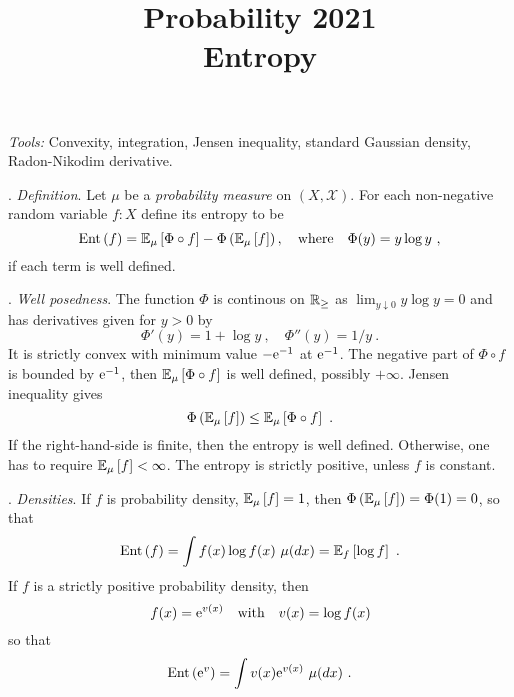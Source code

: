 \documentclass[12pt,a4paper]{amsart}
\title{Probability 2021 \\ Entropy}
\renewcommand{\entropyof}[1]{\operatorname{Ent}\left(#1\right)}
\begin{document}
\maketitle
\noindent\emph{Tools:} Convexity, integration, Jensen inequality, standard Gaussian density, Radon-Nikodim derivative.

\bigskip

. \emph{Definition}. Let $\mu$ be a \emph{probability measure} on
$(X,\mathcal X)$. For each non-negative random variable $f \colon X$
define its entropy to be
\begin{equation*}
  \entropyof{f} = \expectat \mu {\Phi\circ f} - \Phi\left(\expectat
    \mu f\right), \quad \text{where} \quad \Phi(y) = y \log y \ ,
\end{equation*}
if each term is well defined.

. \emph{Well posedness}. The function $\Phi$ is continous
on $\mathbb{R}_\geq$ as $\lim_{y \downarrow 0} y \log y = 0$ and has
derivatives given for $y > 0$ by
\begin{equation*}
  \Phi'(y) = 1 + \log y \ , \quad \Phi''(y)= 1/y \ .  
\end{equation*}
It is strictly convex with minimum value $-\mathrm{e}^{-1}$ at
$\mathrm{e}^{-1}$. The negative part of $\Phi\circ f$ is bounded by
$\mathrm{e}^{-1}$, then $\operatorname{\mathbb E}_{\mu}\left[\Phi\circ f\right]$ is well defined,
possibly $+\infty$. Jensen inequality gives
\begin{equation*}
  \Phi\left(\operatorname{\mathbb E}_{\mu}\left[f\right]\right) \leq \operatorname{\mathbb E}_{\mu}\left[\Phi\circ f\right] \ .
\end{equation*}
If the right-hand-side is finite, then the entropy is well
defined. Otherwise, one has to require $\operatorname{\mathbb E}_{\mu}\left[f\right] < \infty$. The
entropy is strictly positive, unless $f$ is constant.

. \emph{Densities}. If $f$ is probability density,
$\operatorname{\mathbb E}_{\mu}\left[f\right] = 1$, then $\Phi\left(\operatorname{\mathbb E}_{\mu}\left[f\right]\right) =
\Phi(1) = 0$, so that
\begin{equation*}
  \entropyof f = \int f(x) \log f(x) \ \mu(dx) = \expectat f {\log f}
  \ .
\end{equation*}
If $f$ is a strictly positive probability density, then
\begin{equation*}
  f(x) = \mathrm{e}^{v(x)} \quad \text{with} \quad v(x) = \log f(x)
\end{equation*}
so that
\begin{equation*}
  \entropyof{\euler^{v}} = \int v(x) \euler^{v(x)} \ \mu(dx) \ .
\end{equation*}
\end{document}
